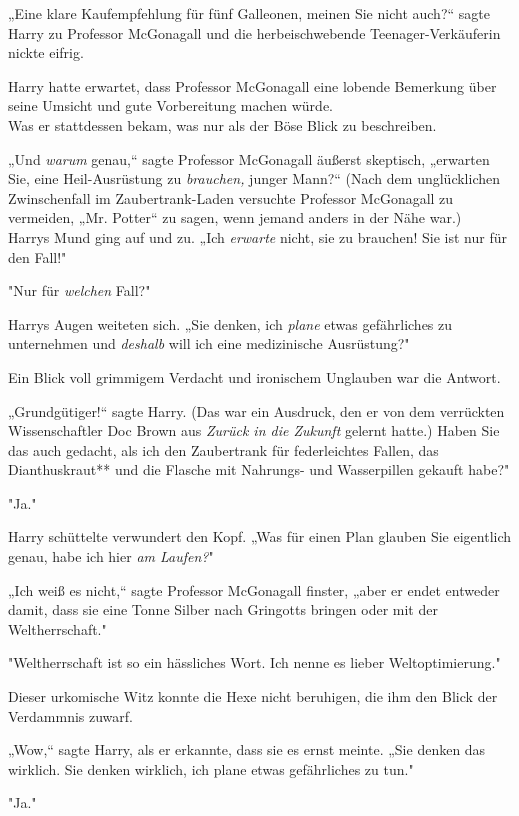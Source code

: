 {„Eine klare Kaufempfehlung für fünf Galleonen, meinen Sie nicht auch?“ sagte Harry zu Professor McGonagall und die herbeischwebende Teenager-Verkäuferin nickte eifrig.

Harry hatte erwartet, dass Professor McGonagall eine lobende Bemerkung über seine Umsicht und gute Vorbereitung machen würde.\\ Was er stattdessen bekam, was nur als der Böse Blick zu beschreiben.

„Und \emph{warum} genau,“ sagte Professor McGonagall äußerst skeptisch, „erwarten Sie, eine Heil-Ausrüstung zu \emph{brauchen,} junger Mann?“ (Nach dem unglücklichen Zwinschenfall im Zaubertrank-Laden versuchte Professor McGonagall zu vermeiden, „Mr. Potter“ zu sagen, wenn jemand anders in der Nähe war.)\\ Harrys Mund ging auf und zu. „Ich \emph{erwarte} nicht, sie zu brauchen! Sie ist nur für den Fall!"

"Nur für \emph{welchen} Fall?"

Harrys Augen weiteten sich. „Sie denken, ich \emph{plane} etwas gefährliches zu unternehmen und \emph{deshalb} will ich eine medizinische Ausrüstung?"

Ein Blick voll grimmigem Verdacht und ironischem Unglauben war die Antwort.

„Grundgütiger!“ sagte Harry. (Das war ein Ausdruck, den er von dem verrückten Wissenschaftler Doc Brown aus \emph{Zurück in die Zukunft} gelernt hatte.) Haben Sie das auch gedacht, als ich den Zaubertrank für federleichtes Fallen, das Dianthuskraut** und die Flasche mit Nahrungs- und Wasserpillen gekauft habe?"

"Ja."

Harry schüttelte verwundert den Kopf. „Was für einen Plan glauben Sie eigentlich genau, habe ich hier \emph{am Laufen?}"

„Ich weiß es nicht,“ sagte Professor McGonagall finster, „aber er endet entweder damit, dass sie eine Tonne Silber nach Gringotts bringen oder mit der Weltherrschaft."

"Weltherrschaft ist so ein hässliches Wort. Ich nenne es lieber Weltoptimierung."

Dieser urkomische Witz konnte die Hexe nicht beruhigen, die ihm den Blick der Verdammnis zuwarf.

„Wow,“ sagte Harry, als er erkannte, dass sie es ernst meinte. „Sie denken das wirklich. Sie denken wirklich, ich plane etwas gefährliches zu tun."

"Ja."

}
